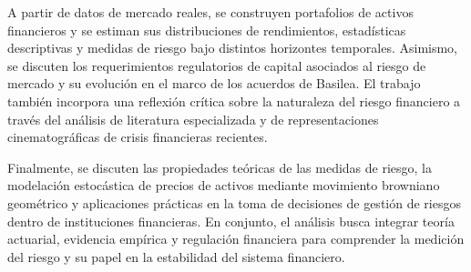 A partir de datos de mercado reales, se construyen portafolios de activos financieros y se estiman sus distribuciones de rendimientos, estadísticas descriptivas y medidas de riesgo bajo distintos horizontes temporales. Asimismo, se discuten los requerimientos regulatorios de capital asociados al riesgo de mercado y su evolución en el marco de los acuerdos de Basilea. El trabajo también incorpora una reflexión crítica sobre la naturaleza del riesgo financiero a través del análisis de literatura especializada y de representaciones cinematográficas de crisis financieras recientes.

Finalmente, se discuten las propiedades teóricas de las medidas de riesgo, la modelación estocástica de precios de activos mediante movimiento browniano geométrico y aplicaciones prácticas en la toma de decisiones de gestión de riesgos dentro de instituciones financieras. En conjunto, el análisis busca integrar teoría actuarial, evidencia empírica y regulación financiera para comprender la medición del riesgo y su papel en la estabilidad del sistema financiero.


\renewcommand{\contentsname}{Índice}
\tableofcontents
\thispagestyle{empty}
\newpage



